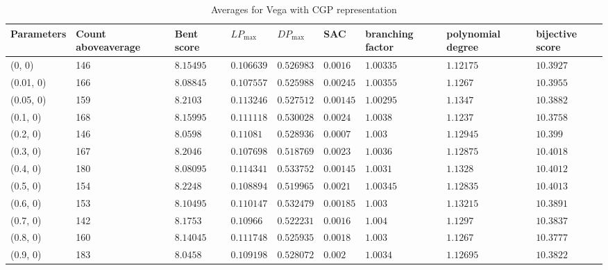 \begin{center}
{\begin{longtable}{| l | p{} |  p{} | p{} | p{} | p{} | p{} | p{} | p{} |}
\caption{Averages for Vega with CGP representation}\label{tabVegaParametersCgp}\\
\hline
Parameters & Count above\-average  & Bent score & $LP_{\max}$ & $DP_{\max}$ & SAC & branching factor & polynomial degree & bijective score \\ \hline
\endhead
 (0, 0) & 146  & $8.15495$ & $0.106639$ & $0.526983$ & $0.0016$ & $1.00335$ & $1.12175$ & $10.3927$ \\ \hline
 (0.01, 0) & 166  & $8.08845$ & $0.107557$ & $0.525988$ & $0.00245$ & $1.00355$ & $1.1267$ & $10.3955$ \\ \hline
 (0.05, 0) & 159  & $8.2103$ & $0.113246$ & $0.527512$ & $0.00145$ & $1.00295$ & $1.1347$ & $10.3882$ \\ \hline
 (0.1, 0) & 168  & $8.15995$ & $0.111118$ & $0.530028$ & $0.0024$ & $1.0038$ & $1.1237$ & $10.3758$ \\ \hline
 (0.2, 0) & 146  & $8.0598$ & $0.11081$ & $0.528936$ & $0.0007$ & $1.003$ & $1.12945$ & $10.399$ \\ \hline
 (0.3, 0) & 167  & $8.2046$ & $0.107698$ & $0.518769$ & $0.0023$ & $1.0036$ & $1.12875$ & $10.4018$ \\ \hline
 (0.4, 0) & 180  & $8.08095$ & $0.114341$ & $0.533752$ & $0.00145$ & $1.0031$ & $1.1328$ & $10.4012$ \\ \hline
 (0.5, 0) & 154  & $8.2248$ & $0.108894$ & $0.519965$ & $0.0021$ & $1.00345$ & $1.12835$ & $10.4013$ \\ \hline
 (0.6, 0) & 153  & $8.10495$ & $0.110147$ & $0.532479$ & $0.00185$ & $1.003$ & $1.13215$ & $10.3891$ \\ \hline
 (0.7, 0) & 142  & $8.1753$ & $0.10966$ & $0.522231$ & $0.0016$ & $1.004$ & $1.1297$ & $10.3837$ \\ \hline
 (0.8, 0) & 160  & $8.14045$ & $0.111748$ & $0.525935$ & $0.0018$ & $1.003$ & $1.1267$ & $10.3777$ \\ \hline
 (0.9, 0) & 183  & $8.0458$ & $0.109198$ & $0.528072$ & $0.002$ & $1.0034$ & $1.12695$ & $10.3822$ \\ \hline
\end{longtable}

}
\end{center}
